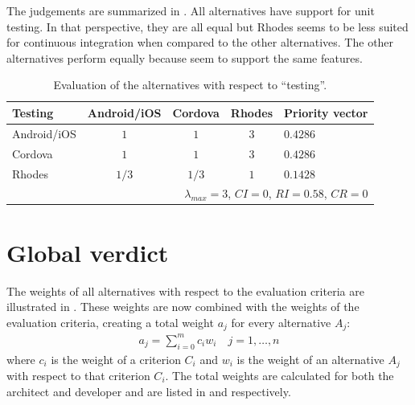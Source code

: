 The judgements are summarized in . All alternatives have support for unit testing. In that perspective, they are all equal but Rhodes seems to be less suited for continuous integration when compared to the other alternatives. The other alternatives perform equally because seem to support the same features.

\begin{table}[h!]
    \centering
    \begin{tabular}{lcccl}
        \hline
        \textbf{Testing} & Android/iOS & Cordova & Rhodes & Priority vector \\
        \hline
        Android/iOS      & $1$         & $1$     & $3$    & $0.4286$ \\
        Cordova          & $1$         & $1$     & $3$    & $0.4286$ \\
        Rhodes           & $1/3$       & $1/3$   & $1$    & $0.1428$ \\
        \hline
        \multicolumn{5}{r}{$\lambda_{max} = 3$, $CI = 0$, $RI = 0.58$, $CR = 0$}\\
        \hline
    \end{tabular}
    \caption{Evaluation of the alternatives with respect to ``testing''.}
    \label{tab:testing}
\end{table}

\section{Global verdict}

The weights of all alternatives with respect to the evaluation criteria are illustrated in . These weights are now combined with the weights of the evaluation criteria, creating a total weight $a_j$ for every alternative $A_j$:
\begin{gather*}
    a_j = \sum_{i = 0}^{m} c_i w_i \quad j = 1, \ldots, n
\end{gather*}
where $c_i$ is the weight of a criterion $C_i$ and $w_i$ is the weight of an alternative $A_j$ with respect to that criterion $C_i$. The total weights are calculated for both the architect and developer and are listed in  and  respectively. 

